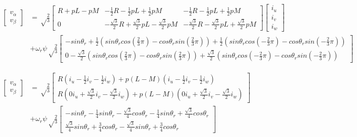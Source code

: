 \begin{fleqn}[8pt]
{\begin{align*}
    \begin{bmatrix}
        v_{\alpha} \\
        v_{\beta}
    \end{bmatrix}
    &= \sqrt\frac{2}{3}
    \begin{bmatrix}
        R+pL-pM & -\frac{1}{2}R-\frac{1}{2}pL+\frac{1}{2}pM & -\frac{1}{2}R-\frac{1}{2}pL+\frac{1}{2}pM \\
        0 & -\frac{\sqrt{3}}{2}R + \frac{\sqrt{3}}{2}pL - \frac{\sqrt{3}}{2}pM & -\frac{\sqrt{3}}{2}R - \frac{\sqrt{3}}{2}pL + \frac{\sqrt{3}}{2}pM
    \end{bmatrix}
    \begin{bmatrix}
        i_{u} \\
        i_{v} \\
        i_{w}
    \end{bmatrix}
    \\
    &+ \omega_{r}\psi\sqrt\frac{2}{3}
    \begin{bmatrix}
        -sin\theta_{r} + \frac{1}{2}(sin\theta_{r}cos(\frac{2}{3}\pi) - cos\theta_{r}sin(\frac{2}{3}\pi)) + \frac{1}{2}(sin\theta_{r}cos(-\frac{2}{3}\pi) - cos\theta_{r}sin(-\frac{2}{3}\pi)) \\
        0 - \frac{\sqrt{3}}{2}(sin\theta_{r}cos(\frac{2}{3}\pi) - cos\theta_{r}sin(\frac{2}{3}\pi)) + \frac{\sqrt{3}}{2}(sin\theta_{r}cos(-\frac{2}{3}\pi) - cos\theta_{r}sin(-\frac{2}{3}\pi))
    \end{bmatrix}
\end{align*}

\begin{align*}
    \begin{bmatrix}
        v_{\alpha} \\
        v_{\beta}
    \end{bmatrix}
    &= \sqrt\frac{2}{3}
    \begin{bmatrix}
        R(i_{u} - \frac{1}{2}i_{v} - \frac{1}{2}i_{w}) + p(L-M)(i_{u} - \frac{1}{2}i_{v} - \frac{1}{2}i_{w}) \\
        R(0i_{u} + \frac{\sqrt{3}}{2}i_{v} - \frac{\sqrt{3}}{2}i_{w}) + p(L-M)(0i_{u} + \frac{\sqrt{3}}{2}i_{v} - \frac{\sqrt{3}}{2}i_{w})
    \end{bmatrix}
    \\
    &+ \omega_{r}\psi\sqrt\frac{2}{3}
    \begin{bmatrix}
        -sin\theta_{r} - \frac{1}{4}sin\theta_{r} - \frac{\sqrt{3}}{4}cos\theta_{r} - \frac{1}{4}sin\theta_{r} + \frac{\sqrt{3}}{4}cos\theta_{r} \\
        \frac{\sqrt{3}}{4}sin\theta_{r} + \frac{3}{4}cos\theta_{r} - \frac{\sqrt{3}}{4}sin\theta_{r} + \frac{3}{4}cos\theta_{r}
    \end{bmatrix}
\end{align*}

}
\end{fleqn}
